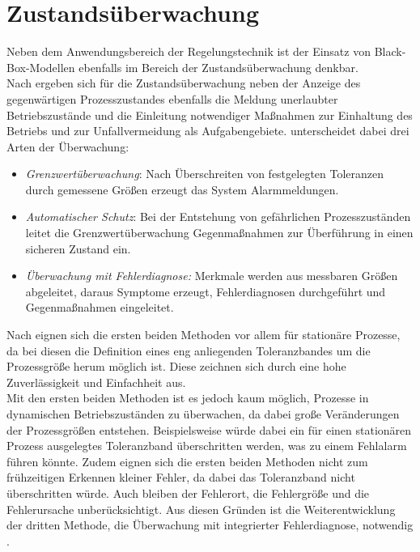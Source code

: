 \section{Zustandsüberwachung}

Neben dem Anwendungsbereich der Regelungstechnik ist der Einsatz von Black-Box-Modellen ebenfalls im Bereich der Zustandsüberwachung denkbar. \\
Nach \cite{Isermann.2010} ergeben sich für die Zustandsüberwachung neben der Anzeige des gegenwärtigen Prozesszustandes ebenfalls die Meldung unerlaubter Betriebszustände und die Einleitung notwendiger Maßnahmen zur Einhaltung des Betriebs und zur Unfallvermeidung als Aufgabengebiete. \cite{Isermann.2010} unterscheidet dabei drei Arten der Überwachung:


\begin{itemize}
	\item \textit{Grenzwertüberwachung}: Nach Überschreiten von festgelegten Toleranzen durch gemessene Größen erzeugt das System Alarmmeldungen.
	\item \textit{Automatischer Schutz}: Bei der Entstehung von gefährlichen Prozesszuständen leitet die Grenzwertüberwachung Gegenmaßnahmen zur Überführung in einen sicheren Zustand ein. 
	\item \textit{Überwachung mit Fehlerdiagnose:} Merkmale werden aus messbaren Größen abgeleitet, daraus Symptome erzeugt, Fehlerdiagnosen durchgeführt und Gegenmaßnahmen eingeleitet. \cite{Isermann.2010}
\end{itemize} 
  
Nach \cite{Isermann.2010} eignen sich die ersten beiden Methoden vor allem für stationäre Prozesse, da bei diesen die Definition eines eng anliegenden Toleranzbandes um die Prozessgröße herum möglich ist. Diese zeichnen sich durch eine hohe Zuverlässigkeit und Einfachheit aus. \cite{Isermann.2010} \\
Mit den ersten beiden Methoden ist es jedoch kaum möglich, Prozesse in dynamischen Betriebszuständen zu überwachen, da dabei große Veränderungen der Prozessgrößen entstehen. Beispielsweise würde dabei ein für einen stationären Prozess ausgelegtes Toleranzband überschritten werden, was zu einem Fehlalarm führen könnte. Zudem eignen sich die ersten beiden Methoden nicht zum frühzeitigen Erkennen kleiner Fehler, da dabei das Toleranzband nicht überschritten würde. Auch bleiben der Fehlerort, die Fehlergröße und die Fehlerursache unberücksichtigt. Aus diesen Gründen ist die Weiterentwicklung der dritten Methode, die Überwachung mit integrierter Fehlerdiagnose, notwendig \cite{Isermann.2010}. \\

